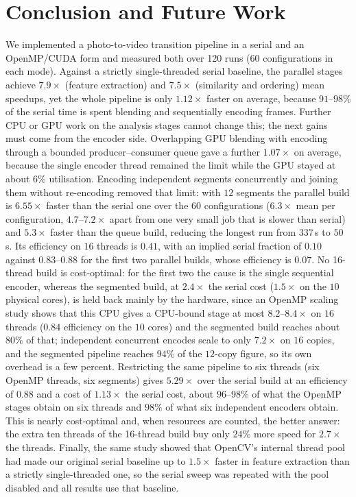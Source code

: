 \documentclass[conference]{IEEEtran}
\begin{document}
\section{Conclusion and Future Work}
We implemented a photo-to-video transition pipeline in a serial and an OpenMP/CUDA form and measured both over 120 runs (60 configurations in each mode). Against a strictly single-threaded serial baseline, the parallel stages achieve $7.9\times$ (feature extraction) and $7.5\times$ (similarity and ordering) mean speedups, yet the whole pipeline is only $1.12\times$ faster on average, because $91$--$98\%$ of the serial time is spent blending and sequentially encoding frames. Further CPU or GPU work on the analysis stages cannot change this; the next gains must come from the encoder side. Overlapping GPU blending with encoding through a bounded producer--consumer queue gave a further $1.07\times$ on average, because the single encoder thread remained the limit while the GPU stayed at about $6\%$ utilisation. Encoding independent segments concurrently and joining them without re-encoding removed that limit: with $12$ segments the parallel build is $6.55\times$ faster than the serial one over the $60$ configurations ($6.3\times$ mean per configuration, $4.7$--$7.2\times$ apart from one very small job that is slower than serial) and $5.3\times$ faster than the queue build, reducing the longest run from $337$\,s to $50$\,s. Its efficiency on $16$ threads is $0.41$, with an implied serial fraction of $0.10$ against $0.83$--$0.88$ for the first two parallel builds, whose efficiency is $0.07$. No 16-thread build is cost-optimal: for the first two the cause is the single sequential encoder, whereas the segmented build, at $2.4\times$ the serial cost ($1.5\times$ on the $10$ physical cores), is held back mainly by the hardware, since an OpenMP scaling study shows that this CPU gives a CPU-bound stage at most $8.2$--$8.4\times$ on $16$ threads ($0.84$ efficiency on the $10$ cores) and the segmented build reaches about $80\%$ of that; independent concurrent encodes scale to only $7.2\times$ on $16$ copies, and the segmented pipeline reaches $94\%$ of the $12$-copy figure, so its own overhead is a few percent. Restricting the same pipeline to six threads (six OpenMP threads, six segments) gives $5.29\times$ over the serial build at an efficiency of $0.88$ and a cost of $1.13\times$ the serial cost, about $96$--$98\%$ of what the OpenMP stages obtain on six threads and $98\%$ of what six independent encoders obtain. This is nearly cost-optimal and, when resources are counted, the better answer: the extra ten threads of the 16-thread build buy only $24\%$ more speed for $2.7\times$ the threads. Finally, the same study showed that OpenCV's internal thread pool had made our original serial baseline up to $1.5\times$ faster in feature extraction than a strictly single-threaded one, so the serial sweep was repeated with the pool disabled and all results use that baseline.
\end{document}
